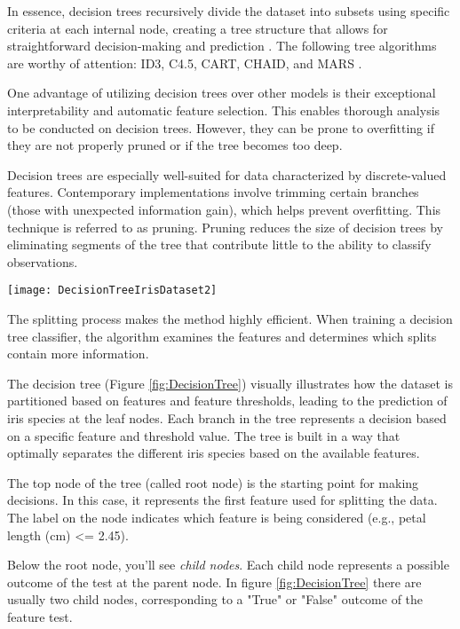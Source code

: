 In essence, decision trees recursively divide the dataset into subsets using specific criteria at each internal node, creating a tree structure that allows for straightforward decision-making and prediction \cite{J_Zico_Kolter2006}. The following tree algorithms are worthy of attention:  ID3, C4.5, CART, CHAID, and MARS \cite{Tom_M_Mitchell1997, Jerome_H_Friedman1991}.

One advantage of utilizing decision trees over other models is their exceptional interpretability and automatic feature selection. This enables thorough analysis to be conducted on decision trees. However, they can be prone to overfitting if they are not properly pruned or if the tree becomes too deep.

Decision trees are especially well-suited for data characterized by discrete-valued features. Contemporary implementations involve trimming certain branches (those with unexpected information gain), which helps prevent overfitting. This technique is referred to as pruning. Pruning reduces the size of decision trees by eliminating segments of the tree that contribute little to the ability to classify observations.

\begin{figure*}[ht]
	\centering
	\texttt{[image: DecisionTreeIrisDataset2]}
	  \caption{Decision tree trained on the iris dataset}
  \label{fig:DecisionTree}
\end{figure*}

The splitting process makes the method highly efficient. When training a decision tree classifier, the algorithm examines the features and determines which splits contain more information.

The decision tree (Figure \ref{fig:DecisionTree}) visually illustrates how the dataset is partitioned based on features and feature thresholds, leading to the prediction of iris species at the leaf nodes. Each branch in the tree represents a decision based on a specific feature and threshold value. The tree is built in a way that optimally separates the different iris species based on the available features.

The top node of the tree (called root node) is the starting point for making decisions. In this case, it represents the first feature used for splitting the data. The label on the node indicates which feature is being considered (e.g., petal length (cm) <= 2.45).

Below the root node, you'll see \textit{child nodes}. Each child node represents a possible outcome of the test at the parent node. In figure \ref{fig:DecisionTree} there are usually two child nodes, corresponding to a "True" or "False" outcome of the feature test.

